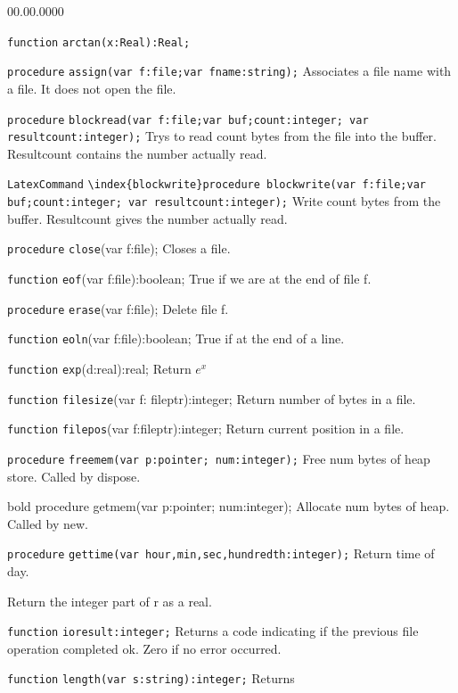 {\begin{lyxlist}{00.00.0000}
\item [\texttt{function}]\texttt{arctan(x:Real):Real;}
\item [\texttt{procedure}]\texttt{assign(var f:file;var fname:string);}
Associates a file name with a file. It does not open the file.
\item [\texttt{procedure}]\texttt{blockread(var f:file;var buf;count:integer;
var resultcount:integer);} Trys to read count bytes from the file into the buffer.
Resultcount contains the number actually read.
\item [\texttt{LatexCommand}]\texttt{\textbackslash{}index\{blockwrite\}procedure
blockwrite(var f:file;var buf;count:integer; var resultcount:integer);} Write
count bytes from the buffer. Resultcount gives the number actually read.
\item [\texttt{procedure}]\texttt{close}(var f:file); Closes a file.
\item [\texttt{function}]\texttt{eof}(var f:file):boolean; True if we
are at the end of file f.
\item [\texttt{procedure}]\texttt{erase}(var f:file); Delete file f.
\item [\texttt{function}]\texttt{eoln}(var f:file):boolean; True if at
the end of a line.
\item [\texttt{function}]\texttt{exp}(d:real):real; Return $ e^{x} $
\item [\texttt{function}]\texttt{filesize}(var f: fileptr):integer;
Return number of bytes in a file.
\item [\texttt{function}]\texttt{filepos}(var f:fileptr):integer;
Return current position in a file.
\item [\texttt{procedure}]\texttt{freemem(var p:pointer; num:integer);}
Free num bytes of heap store. Called by dispose.
\item [\-bold]procedure getmem(var p:pointer; num:integer); Allocate
num bytes of heap. Called by new.
\item [\texttt{procedure}]\texttt{gettime(var hour,min,sec,hundredth:integer);}
Return time of day.
\item [\texttt{}]Return the integer part of r as a real.
\item [\texttt{function}]\texttt{ioresult:integer;} Returns a code indicating if the
previous file operation completed ok. Zero if no error occurred.
\item [\texttt{function}]\texttt{length(var s:string):integer;} Returns

\end{lyxlist}}
